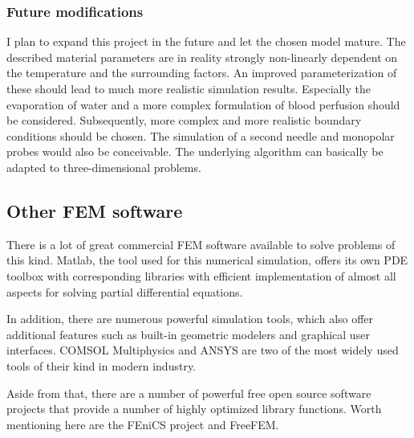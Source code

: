 \documentclass[parskip=half, titlepage=yes, 12pt, BCOR=12mm, DIV=calc]{scrartcl}
\begin{document}
\subsubsection{Future modifications}
I plan to expand this project in the future and let the chosen model mature. The described material parameters are in reality strongly non-linearly dependent on the temperature and the surrounding factors. An improved parameterization of these should lead to much more realistic simulation results. Especially the evaporation of water and a more complex formulation of blood perfusion should be considered. Subsequently, more complex and more realistic boundary conditions should be chosen. 
The simulation of a second needle and monopolar probes would also be conceivable. The underlying algorithm can basically be adapted to three-dimensional problems.



\subsection{Other FEM software}

There is a lot of great commercial FEM software available to solve problems of this kind. Matlab, the tool used for this numerical simulation, offers its own PDE toolbox with corresponding libraries with efficient implementation of almost all aspects for solving partial differential equations.

In addition, there are numerous powerful simulation tools, which also offer additional features such as built-in geometric modelers and graphical user interfaces. COMSOL Multiphysics and ANSYS are two of the most widely used tools of their kind in modern industry.

Aside from that, there are a number of powerful free open source software projects that provide a number of highly optimized library functions. Worth mentioning here are the FEniCS project and FreeFEM.


\newpage


\clearpage
\nocite{*}
\printbibliography

\newpage


%  
\end{document}

